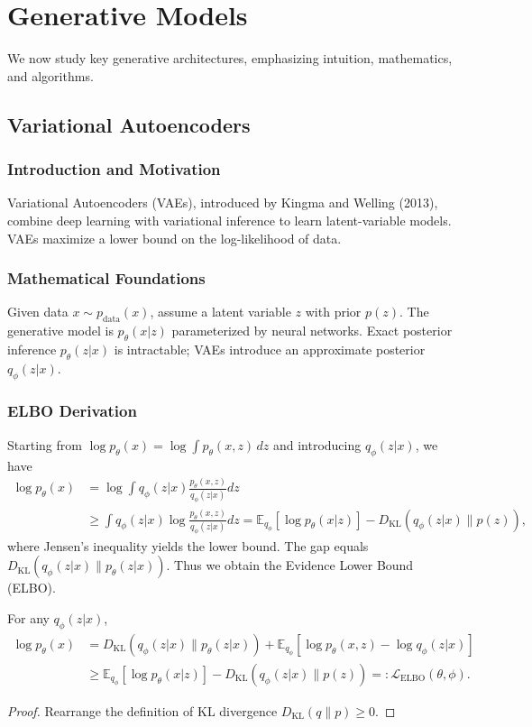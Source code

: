\chapter{Generative Models}\label{sec:gen}
We now study key generative architectures, emphasizing intuition, mathematics, and algorithms.

\section{Variational Autoencoders}
\subsection{Introduction and Motivation}
Variational Autoencoders (VAEs), introduced by Kingma and Welling (2013), combine deep learning with variational inference to learn latent-variable models. VAEs maximize a lower bound on the log-likelihood of data.

\subsection{Mathematical Foundations}
Given data $x\sim p_\text{data}(x)$, assume a latent variable $z$ with prior $p(z)$. The generative model is $p_\theta(x|z)$ parameterized by neural networks. Exact posterior inference $p_\theta(z|x)$ is intractable; VAEs introduce an approximate posterior $q_\phi(z|x)$.

\subsection{ELBO Derivation}
Starting from $\log p_\theta(x)=\log \int p_\theta(x,z)\, dz$ and introducing $q_\phi(z|x)$, we have
\begin{align}
\log p_\theta(x) &= \log \int q_\phi(z|x) \frac{p_\theta(x,z)}{q_\phi(z|x)} dz \\ 
&\ge \int q_\phi(z|x) \log \frac{p_\theta(x,z)}{q_\phi(z|x)} dz = \mathbb{E}_{q_\phi}[\log p_\theta(x|z)] - D_{\mathrm{KL}}(q_\phi(z|x)\|p(z)),
\end{align}
where Jensen's inequality yields the lower bound. The gap equals $D_{\mathrm{KL}}(q_\phi(z|x)\|p_\theta(z|x))$. Thus we obtain the Evidence Lower Bound (ELBO).

\begin{theorem}
For any $q_\phi(z|x)$,
\begin{align}
\log p_\theta(x) &= D_{\mathrm{KL}}(q_\phi(z|x)\|p_\theta(z|x)) + \mathbb{E}_{q_\phi} [\log p_\theta(x,z) - \log q_\phi(z|x)] \\
&\ge \mathbb{E}_{q_\phi} [\log p_\theta(x|z)] - D_{\mathrm{KL}}(q_\phi(z|x)\|p(z)) =: \mathcal{L}_{\text{ELBO}}(\theta,\phi).
\end{align}
\end{theorem}
\begin{proof}
Rearrange the definition of KL divergence $D_{\mathrm{KL}}(q\|p)\ge0$.
\end{proof}

